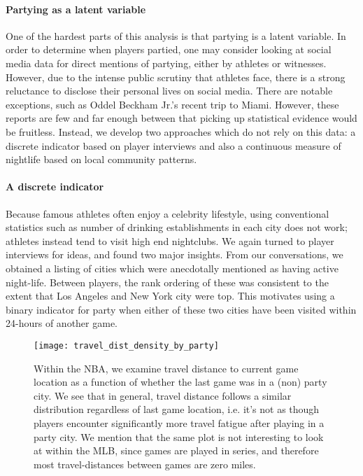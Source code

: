 \documentclass[letterpaper,12pt]{article}
\begin{document}
\paragraph{Partying as a latent variable}
One of the hardest parts of this analysis is that partying is a latent variable.
In order to determine when players partied, one may consider looking at social media data for direct mentions of partying, either by athletes or witnesses. However, due to the intense public scrutiny that athletes face, there is a strong reluctance to disclose their personal lives on social media. There are notable exceptions, such
as Oddel Beckham Jr.'s recent trip to Miami.\citep{bleler}
However, these reports are few and far enough between that picking up statistical evidence would be fruitless.
Instead, we develop two approaches which do not rely on this data: a discrete indicator 
based on player interviews and also a continuous measure of nightlife based on local community patterns.

\paragraph{A discrete indicator}
Because famous athletes often enjoy a celebrity lifestyle, using conventional statistics
such as number of drinking establishments in each city does not work; athletes instead
tend to visit high end nightclubs. We again turned to player interviews for ideas,
and found two major insights. From our conversations, 
we obtained a listing of cities which were anecdotally
mentioned as having active night-life. Between players, the rank ordering of these
was consistent to the extent that Los Angeles and New York city were top. 
This motivates using a binary indicator for party when either of these two cities have been visited within 24-hours of another game. 


\begin{figure}
  \centering
  \texttt{[image: travel\_dist\_density\_by\_party]}
  \label{fig: density by party}
  \caption{Within the NBA, we examine travel distance to current game location as a function of
    whether the last game was in a (non) party city. We see that in general,
  travel distance follows a similar distribution regardless of last game location, i.e. 
  it's not as though players encounter significantly
  more travel fatigue after playing in a party city. We mention that the same plot is not interesting to look at within the MLB, since games are played in series, and therefore most travel-distances between games are zero miles.}
\end{figure}
\end{document}
